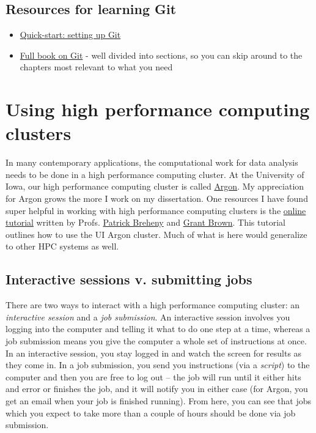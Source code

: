 \documentclass[
]{book}
\begin{document}
\hypertarget{resources-for-learning-git}{%
\subsection{Resources for learning Git}\label{resources-for-learning-git}}

\begin{itemize}
\item
  \href{https://docs.github.com/en/get-started/quickstart/set-up-git}{Quick-start: setting up Git}
\item
  \href{https://git-scm.com/book/en/v2}{Full book on Git} - well divided into sections, so you can skip around to the chapters most relevant to what you need
\end{itemize}

\hypertarget{using-high-performance-computing-clusters}{%
\section{Using high performance computing clusters}\label{using-high-performance-computing-clusters}}

In many contemporary applications, the computational work for data analysis needs to be done in a high performance computing cluster. At the University of Iowa, our high performance computing cluster is called \href{https://wiki.uiowa.edu/display/hpcdocs/Argon+Cluster}{Argon}. My appreciation for Argon grows the more I work on my dissertation. One resources I have found super helpful in working with high performance computing clusters is the \href{https://iowabiostat.github.io/hpc/index.html}{online tutorial} written by Profs. \href{https://myweb.uiowa.edu/pbreheny/}{Patrick Breheny} and \href{http://grantbrown.github.io/}{Grant Brown}. This tutorial outlines how to use the UI Argon cluster. Much of what is here would generalize to other HPC systems as well.

\hypertarget{interactive-sessions-v.-submitting-jobs}{%
\subsection{Interactive sessions v. submitting jobs}\label{interactive-sessions-v.-submitting-jobs}}

There are two ways to interact with a high performance computing cluster: an \emph{interactive session} and a \emph{job submission}. An interactive session involves you logging into the computer and telling it what to do one step at a time, whereas a job submission means you give the computer a whole set of instructions at once. In an interactive session, you stay logged in and watch the screen for results as they come in. In a job submission, you send you instructions (via a \emph{script}) to the computer and then you are free to log out -- the job will run until it either hits and error or finishes the job, and it will notify you in either case (for Argon, you get an email when your job is finished running). From here, you can see that jobs which you expect to take more than a couple of hours should be done via job submission.
\end{document}
